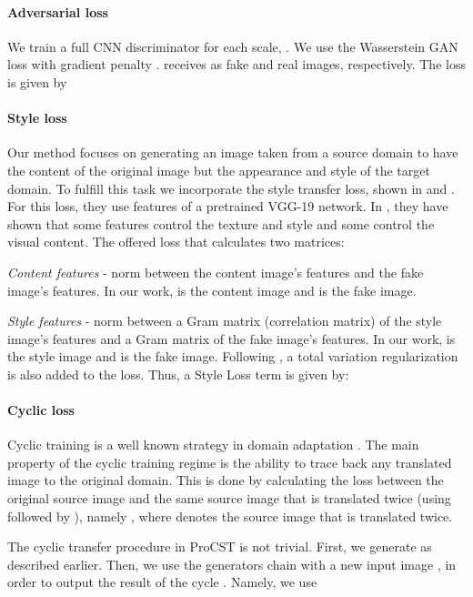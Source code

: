\documentclass[letterpaper]{article} \usepackage[]{aaai23}  \usepackage{times}  \usepackage{helvet}  \usepackage{courier}  \usepackage[hyphens]{url}  \usepackage{graphicx} \urlstyle{rm} \def\UrlFont{\rm}  \usepackage{natbib}  \usepackage{caption} \frenchspacing  \setlength{\pdfpagewidth}{8.5in} \setlength{\pdfpageheight}{11in} \usepackage{algorithm}
\begin{document}
\paragraph{Adversarial loss} We train a full CNN discriminator for each scale, . We use the Wasserstein GAN loss with gradient penalty \cite{gulrajani2017improved}.  receives  as fake and real images, respectively. The loss is given by 


\paragraph{Style loss} Our method focuses on generating an image taken from a source domain to have the content of the original image but the appearance and style of the target domain. To fulfill this task we incorporate the style transfer loss, shown in \citet{gatys2016image} and \citet{johnson2016perceptual}. For this loss, they use features of a pretrained VGG-19 network. In \citet{gatys2016image}, they have shown that some features control the texture and style and some control the visual content. The offered loss that calculates two matrices:

\textit{Content features} -  norm between the content image's features and the fake image's features. In our work,  is the content image and  is the fake image. 

\textit{Style features} -  norm between a Gram matrix (correlation matrix) of the style image's features and a Gram matrix of the fake image's features. In our work,  is the style image and  is the fake image. Following \citet{johnson2016perceptual}, a total variation regularization is also added to the loss. Thus, a Style Loss term is given by:


\paragraph{Cyclic loss} Cyclic training \cite{zhu2017unpaired} is a well known strategy in domain adaptation \cite{hoffman2018cycada}. The main property of the cyclic training regime is the ability to trace back any translated image to the original domain. This is done by calculating the  loss between the original source image and the same source image that is translated twice (using  followed by ), namely , where  denotes the source image that is translated twice.

The cyclic transfer procedure in ProCST is not trivial. First, we generate  as described earlier. Then, we use the generators chain  with a new input image , in order to output the result of the cycle . Namely, we use
 
\end{document}
